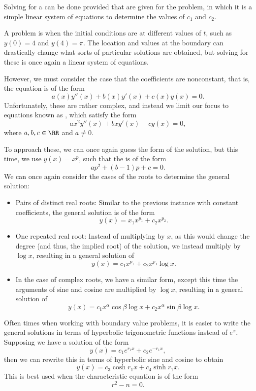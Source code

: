 Solving for a  can be done provided that  are given for the problem, in which it is a simple linear system of equations to determine the values of $c_1$ and  $c_2$. 

A  problem is when the initial conditions are at different values of $t$, such as $y(0) = 4$ and $y(4) = \pi$. The location and values at the boundary can drastically change what sorts of particular solutions are obtained, but solving for these is once again a linear system of equations. 

However, we must consider the case that the coefficients are nonconstant, that is, the equation is of the form 
\[ a(x)y''(x) + b(x)y'(x) + c(x)y(x) = 0. \] Unfortunately, these are rather complex, and instead we limit our focus to equations known as , which satisfy the form 
\[ ax^2y''(x) + bxy'(x) + cy(x) = 0, \] where $a,b,c \in \RR$ and $a \neq 0$. 

To approach these, we can once again guess the form of the solution, but this time, we use $y(x) = x^p$, such that the  is of the form 
\[ ap^2 + (b-1)p + c = 0. \] We can once again consider the cases of the roots to determine the general solution: 
\begin{itemize}
\item Pairs of distinct real roots: Similar to the previous instance with constant coefficients, the general solution is of the form 
\[ y(x) = x_1x^{p_1} + c_2x^{p_2}. \] 
\item One repeated real root: Instead of multiplying by $x$, as this would change the degree (and thus, the implied root) of the solution, we instead multiply by $\log{x}$, resulting in a general solution of 
\[ y(x) = c_1x^{p_1} + c_2x^{p_1}\log{x}. \] 
\item In the case of complex roots, we have a similar form, except this time the arguments of sine and cosine are multiplied by $\log{x}$, resulting in a general solution of 
\[ y(x) = c_1x^\alpha\cos{\beta \log{x}} + c_2x^\alpha \sin{\beta \log{x}}. \] 
\end{itemize}

Often times when working with boundary value problems, it is easier to write the general solutions in terms of hyperbolic trigonometric functions instead of $e^x$. Supposing we have a solution of the form 
\[ y(x) = c_1e^{r_1 x} + c_2e^{-r_1 x}, \] then we can rewrite this in terms of hyperbolic sine and cosine to obtain 
\[ y(x)  = c_3\cosh{r_1x} + c_4\sinh{r_1x}. \] This is best used when the characteristic equation is of the form 
\[ r^2 - n = 0. \] 


